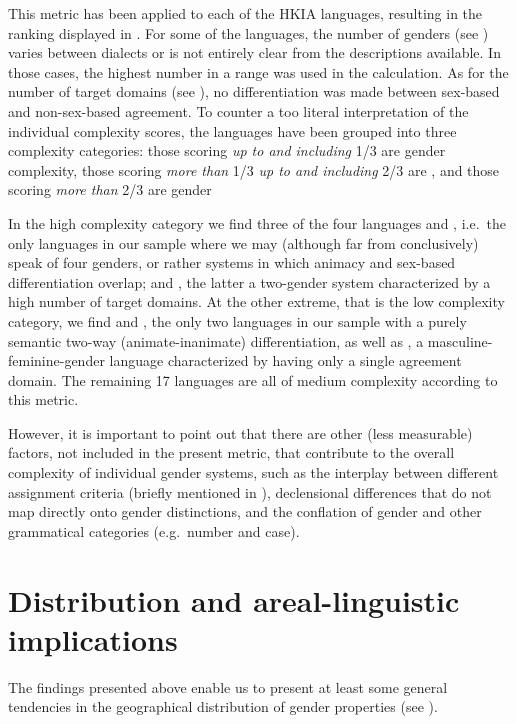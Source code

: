 \documentclass[output=collectionpaper]{langsci/langscibook}
\begin{document}
 
This metric has been applied to each of the HKIA languages, resulting in the ranking displayed in . For some of the languages, the number of genders (see ) varies between dialects or is not entirely clear from the descriptions available. In those cases, the highest number in a range was used in the calculation. As for the number of target domains (see ), no differentiation was made between sex-based and non-sex-based agreement. To counter a too literal interpretation of the individual complexity scores, the languages have been grouped into three complexity categories: those scoring \emph{up to and including} 1/3 are  gender complexity, those scoring \emph{more than} 1/3 \emph{up to and including} 2/3 are , and those scoring \emph{more than} 2/3 are  gender

In the high complexity category we find three of the four  languages and , i.e.\ the only languages in our sample where we may (although far from conclusively) speak of four genders, or rather systems in which animacy and sex-based differentiation overlap; and , the latter a two-gender system characterized by a high number of target domains. At the other extreme, that is the low complexity category, we find  and , the only two languages in our sample with a purely semantic two-way (animate-inanimate) differentiation, as well as , a masculine-feminine-gender language characterized by having only a single agreement domain. The remaining 17 languages are all of medium complexity according to this metric.

\largerpage
However, it is important to point out that there are other (less measurable) factors, not included in the present metric, that contribute to the overall complexity of individual gender systems, such as the interplay between different assignment criteria (briefly mentioned in  ), declensional differences that do not map directly onto gender distinctions, and the conflation of gender and other grammatical categories (e.g.\ number and case).\newpage

\section{Distribution and areal-linguistic implications}

The findings presented above enable us to present at least some general tendencies in the geographical distribution of gender properties (see ).
\end{document}
